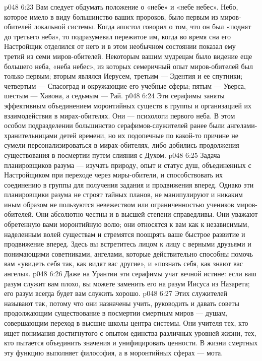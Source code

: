 \vs p048 6:23 \pc Вам следует обдумать положение о «небе» и «небе небес». Небо, которое имело в виду большинство ваших пророков, было первым из миров\hyp{}обителей локальной системы. Когда апостол говорил о том, что он был «поднят до третьего неба», то подразумевал пережитое им, когда во время сна его Настройщик отделился от него и в этом необычном состоянии показал ему третий из семи миров\hyp{}обителей. Некоторым вашим мудрецам было видение еще большего неба, «неба небес», из которых семеричный опыт миров\hyp{}обителей был только первым; вторым являлся Иерусем, третьим --- Эдентия и ее спутники; четвертым --- Спасоград и окружающие его учебные сферы; пятым --- Уверса, шестым --- Хавона, а седьмым --- Рай.
\vs p048 6:24 \bibnobreakspace {} Эти серафимы заняты эффективным объединением моронтийных существ в группы и организацией их взаимодействия в мирах\hyp{}обителях. Они --- психологи первого неба. В этом особом подразделении большинство серафимов\hyp{}служителей ранее были ангелами\hyp{}хранительницами детей времени, но их подопечные по какой\hyp{}то причине не сумели персонализироваться в мирах\hyp{}обителях, либо добились продолжения существования в посмертии путем слияния с Духом.
\vs p048 6:25 Задача планировщиков разума --- изучать природу, опыт и статус душ, объединенных с Настройщиком при переходе через миры\hyp{}обители, и способствовать их соединению в группы для получения задания и продвижения вперед. Однако эти планировщики разума не строят тайных планов, не манипулируют и никаким иным образом не пользуются невежеством или ограниченностью учеников миров\hyp{}обителей. Они абсолютно честны и в высшей степени справедливы. Они уважают обретенную вами моронтийную волю; они относятся к вам как к независимым, наделенным волей существам и стремятся поощрять ваше быстрое развитие и продвижение вперед. Здесь вы встретитесь лицом к лицу с верными друзьями и понимающими советниками, ангелами, которые действительно способны помочь вам «увидеть себя так, как видят вас другие», и «познать себя, как знают вас ангелы».
\vs p048 6:26 Даже на Урантии эти серафимы учат вечной истине: если ваш разум служит вам плохо, вы можете заменить его на разум Иисуса из Назарета; его разум всегда будет вам служить хорошо.
\vs p048 6:27 \bibnobreakspace {} Этих служителей называют так, потому что они назначены учить, руководить и давать советы продолжающим существование в посмертии смертным миров --- душам, совершающим переход в высшие школы центра системы. Они учителя тех, кто ищет понимания достигнутого с опытом единства различных уровней жизни, тех, кто пытается объединить значения и унифицировать ценности. В жизни смертных эту функцию выполняет философия, а в моронтийных сферах --- мота.
